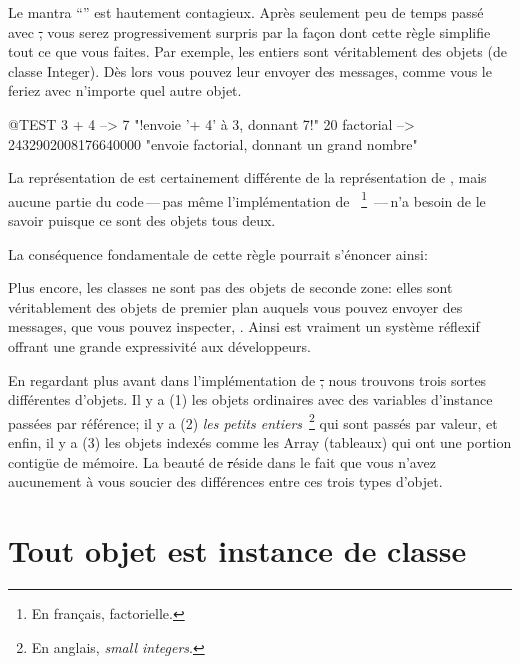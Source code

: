 \documentclass[a4paper,10pt,twoside]{book}
\begin{document}

Le mantra ``\mantra'' est hautement contagieux.
Après seulement peu de temps passé avec \st, vous serez progressivement surpris par la façon dont cette règle simplifie tout ce que vous faites.
Par exemple, les entiers sont véritablement des objets (de classe Integer). Dès lors vous pouvez leur envoyer des messages, comme vous le feriez avec n'importe quel autre objet.

\begin{code}{@TEST}
3 + 4            --> 7    "!envoie '+ 4' à 3, donnant 7!"
20 factorial  --> 2432902008176640000   "envoie factorial, donnant un grand nombre"
\end{code}

La représentation de  est certainement différente de la représentation de , mais aucune partie du code\,---\,pas même l'implémentation de 
~\footnote{En français, factorielle.}
\,---\,n'a besoin de le savoir puisque ce sont des objets tous deux.

La conséquence fondamentale de cette règle pourrait s'énoncer ainsi:

Plus encore, les classes ne sont pas des objets de seconde zone: elles sont véritablement des objets de premier plan auquels vous pouvez envoyer des messages, que vous pouvez inspecter, \etc.
Ainsi \pharo est vraiment un système réflexif offrant une grande expressivité
aux développeurs.

En regardant plus avant dans l'implémentation de \st, nous trouvons
trois sortes différentes d'objets. Il y a (1) les objets ordinaires
avec des variables d'instance passées par référence; il y a (2)
\emph{les petits entiers}~\footnote{En anglais, \emph{small
    integers}.} qui sont passés par valeur, et enfin, il y a (3) les
objets 
indexés comme les Array (tableaux) qui ont une portion contig\"ue de mémoire. La beauté de \st réside 
dans le fait que vous n'avez aucunement à vous soucier des différences entre ces trois types
d'objet.


\section{Tout objet est instance de classe}

\end{document}
